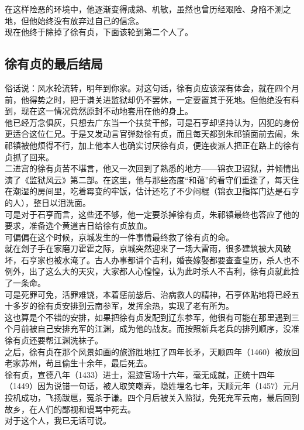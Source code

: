 \begin{multicols}{\theparacolNo}
在这样险恶的环境中，他逐渐变得成熟、机敏，虽然也曾历经艰险、身陷不测之地，但他始终没有放弃过自己的信念。\\

现在他终于除掉了徐有贞，下面该轮到第二个人了。\\

\subsection{徐有贞的最后结局}
俗话说：风水轮流转，明年到你家。对这句话，徐有贞应该深有体会，就在四个月前，他得势之时，把于谦关进监狱却仍不罢休，一定要置其于死地。但他绝没有料到，现在这一情况竟然原封不动地套用在他的身上。\\

他已经万念俱灰，只想去广东当一个扶贫干部，可是石亨却坚持认为，囚犯的身份更适合这位仁兄。于是又发动言官弹劾徐有贞，而且每天都到朱祁镇面前去闹，朱祁镇被他烦得不行，加上他本人也确实讨厌徐有贞，便连夜派人把正在路上的徐有贞抓了回来。\\

二进宫的徐有贞苦不堪言，他又一次回到了熟悉的地方——锦衣卫诏狱，并倾情出演了《监狱风云》第二部。在这里，他与那些态度“和蔼”的看守们重逢了，每天住在潮湿的房间里，吃着霉变的牢饭，估计还吃了不少闷棍（锦衣卫指挥门达是石亨的人），整日以泪洗面。\\

可是对于石亨而言，这些还不够，他一定要杀掉徐有贞，朱祁镇最终也答应了他的要求，准备选个黄道吉日给徐有贞放血。\\

可偏偏在这个时候，京城发生的一件事情最终救了徐有贞的命。\\

就在刽子手在家磨刀霍霍之际，京城突然迎来了一场大雷雨，很多建筑被大风破坏，石亨家也被水淹了。古人办事都讲个吉利，婚丧嫁娶都要查查皇历，杀人也不例外，出了这么大的天灾，大家都人心惶惶，认为此时杀人不吉利，徐有贞就此捡了一条命。\\

可是死罪可免，活罪难饶，本着惩前毖后、治病救人的精神，石亨体贴地将已经五十多岁的徐有贞安排到云南参军，发挥余热，实现了老有所为。\\

这也算是个不错的安排，如果把徐有贞发配到辽东参军，他很有可能在那里遇到三个月前被自己安排充军的江渊，成为他的战友。而按照新兵老兵的排列顺序，没准徐有贞还要帮江渊洗袜子。\\

之后，徐有贞在那个风景如画的旅游胜地扛了四年长矛，天顺四年（1460）被放回老家苏州，苟且偷生十余年，最后死去。\\

徐有贞，宣德八年（1433）进士，混迹官场十六年，毫无成就，正统十四年（1449）因为说错一句话，被人取笑嘲弄，隐姓埋名七年，天顺元年（1457）元月投机成功，飞扬跋扈，冤杀于谦。四个月后被关入监狱，免死充军云南，最后回到故乡，在人们的鄙视和谩骂中死去。\\

对于这个人，我已无话可说。\\
\ifnum{}
	\end{multicols}
\fi
\newpage
